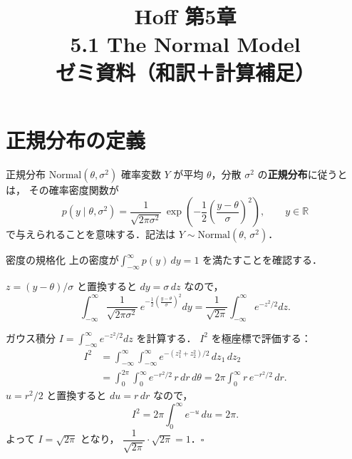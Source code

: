 \documentclass[lualatex,ja=standard,a4paper,12pt]{bxjsarticle}
\title{{\large Hoff 第5章} \\[6pt]
       \textbf{5.1\; The Normal Model} \\[4pt]
       {\normalsize ゼミ資料（和訳＋計算補足）}}
\author{}
\date{}
\begin{document}
\maketitle
\thispagestyle{empty}

\section{正規分布の定義}

\begin{defbox}{正規分布 $\mathrm{Normal}(\theta, \sigma^2)$}
確率変数 $Y$ が平均 $\theta$，分散 $\sigma^2$ の\textbf{正規分布}に従うとは，
その確率密度関数が
\[
  p(y \mid \theta, \sigma^2)
  = \frac{1}{\sqrt{2\pi\sigma^2}}\,
    \exp\!\left(-\frac{1}{2}\left(\frac{y - \theta}{\sigma}\right)^2\right),
  \qquad y \in \mathbb{R}
\]
で与えられることを意味する．記法は $Y \sim \mathrm{Normal}(\theta,\, \sigma^2)$．
\end{defbox}

\begin{derivbox}{密度の規格化}
上の密度が$\int_{-\infty}^{\infty} p(y) \, dy = 1$ を満たすことを確認する．

$z = (y - \theta)/\sigma$ と置換すると $dy = \sigma \, dz$ なので，
\[
  \int_{-\infty}^{\infty}
    \frac{1}{\sqrt{2\pi\sigma^2}}\, e^{-\frac{1}{2}\left(\frac{y-\theta}{\sigma}\right)^2} dy
  = \frac{1}{\sqrt{2\pi}}
    \int_{-\infty}^{\infty} e^{-z^2/2} dz.
\]

ガウス積分 $I = \int_{-\infty}^{\infty} e^{-z^2/2} dz$ を計算する．
$I^2$ を極座標で評価する：
\begin{align*}
  I^2
  &= \int_{-\infty}^{\infty}\int_{-\infty}^{\infty} e^{-(z_1^2+z_2^2)/2}\,dz_1\,dz_2 \\
  &= \int_0^{2\pi}\int_0^{\infty} e^{-r^2/2}\, r\,dr\,d\theta
   = 2\pi \int_0^{\infty} r\, e^{-r^2/2}\,dr.
\end{align*}
$u = r^2/2$ と置換すると $du = r\,dr$ なので，
\[
  I^2 = 2\pi \int_0^{\infty} e^{-u}\,du = 2\pi.
\]
よって $I = \sqrt{2\pi}$ となり，
$\dfrac{1}{\sqrt{2\pi}} \cdot \sqrt{2\pi} = 1$．\hfill $\square$
\end{derivbox}

\bigskip
\end{document}
